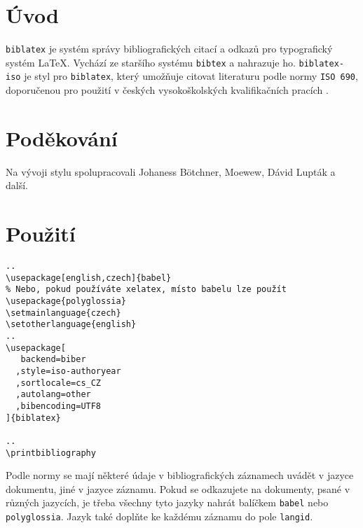 \documentclass[a4paper,10pt]{ltxdockit}
\def\t|#1|{\texttt{#1}}
\begin{document}
\printtitlepage
\tableofcontents
\section{Úvod}
\t|biblatex| je systém správy bibliografických citací a odkazů pro typografický
systém \LaTeX. Vychází ze staršího systému \t|bibtex| a nahrazuje ho.
\t|biblatex-iso| je styl pro \t|biblatex|, který umožňuje citovat literaturu
podle normy \t|ISO 690|, doporučenou pro použití v českých vysokoškolských
kvalifikačních pracích \parencite{t00}.

\section{Poděkování}

Na vývoji stylu spolupracovali Johaness Bötchner, Moewew, Dávid Lupták a další.

\section{Použití}
\begin{verbatim}
..
\usepackage[english,czech]{babel}
% Nebo, pokud používáte xelatex, místo babelu lze použít 
\usepackage{polyglossia}
\setmainlanguage{czech}
\setotherlanguage{english}
..
\usepackage[
   backend=biber
  ,style=iso-authoryear
  ,sortlocale=cs_CZ
  ,autolang=other
  ,bibencoding=UTF8
]{biblatex}

..
\printbibliography

\end{verbatim}

Podle normy se mají některé údaje v bibliografických záznamech uvádět v jazyce
dokumentu, jiné v jazyce záznamu. Pokud se odkazujete na dokumenty, psané v
různých jazycích, je třeba všechny tyto jazyky nahrát balíčkem \t|babel| nebo
\t|polyglossia|. Jazyk také doplňte ke každému záznamu do pole \t|langid|.

\end{document}
